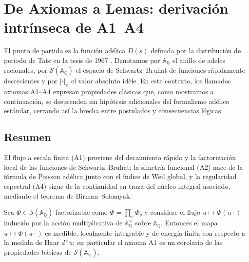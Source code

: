 \section{De Axiomas a Lemas: derivación intrínseca de A1--A4}

El punto de partida es la función adélica $D(s)$ definida por la distribución de
periodo de Tate en la tesis de 1967 \cite{Tate1967}.  Denotamos por
$\mathbb{A}_\mathbb{Q}$ el anillo de adeles racionales, por
$\mathcal{S}(\mathbb{A}_\mathbb{Q})$ el espacio de Schwartz--Bruhat de funciones
rápidamente decrecientes y por $|\cdot|_\mathbb{A}$ el valor absoluto idèle.
En este contexto, los llamados axiomas A1--A4 expresan propiedades clásicas que,
como mostramos a continuación, se desprenden sin hipótesis adicionales del
formalismo adélico estándar, cerrando así la brecha entre postulados y
consecuencias lógicas.

\subsection*{Resumen}
El flujo a escala finita (A1) proviene del decaimiento rápido y la factorización
local de las funciones de Schwartz--Bruhat; la simetría funcional (A2) nace de la
fórmula de Poisson adélica junto con el índice de Weil global, y la regularidad
espectral (A4) sigue de la continuidad en traza del núcleo integral asociado,
mediante el teorema de Birman--Solomyak.

\begin{lemma}
Sea $\Phi \in \mathcal{S}(\mathbb{A}_\mathbb{Q})$ factorizable como
$\Phi=\prod_v \Phi_v$ y considere el flujo $u \mapsto \Phi(u\cdot)$ inducido por la
acción multiplicativa de $\mathbb{A}_\mathbb{Q}^\times$ sobre $\mathbb{A}_\mathbb{Q}$.
Entonces el mapa $u \mapsto \Phi(u\cdot)$ es medible, localmente integrable y de
energía finita con respecto a la medida de Haar $d^\times u$; en particular el
axioma A1 es un corolario de las propiedades básicas de
$\mathcal{S}(\mathbb{A}_\mathbb{Q})$.
\end{lemma}

